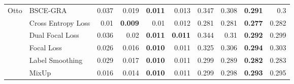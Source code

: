 \begin{table}[htbp]
\begin{tabular}{l l rrrr rrrr}
\cline{1-10}
\multirow[t]{7}{*}{Otto}
 & BSCE-GRA & 0.037 & 0.019 & \textbf{0.011} & 0.013 & 0.347 & 0.308 & \textbf{0.291} & 0.3 \\
 & Cross Entropy Loss & 0.01 & \textbf{0.009} & 0.01 & 0.012 & 0.281 & 0.281 & \textbf{0.277} & 0.282 \\
 & Dual Focal Loss & 0.036 & 0.02 & \textbf{0.011} & \textbf{0.011} & 0.344 & 0.31 & \textbf{0.292} & 0.299 \\
 & Focal Loss & 0.026 & 0.016 & \textbf{0.010} & 0.011 & 0.325 & 0.306 & \textbf{0.294} & 0.303 \\
 & Label Smoothing & 0.029 & 0.017 & \textbf{0.010} & 0.011 & 0.299 & 0.289 & \textbf{0.282} & 0.283 \\
 & MixUp & 0.016 & 0.014 & \textbf{0.010} & 0.011 & 0.299 & 0.298 & \textbf{0.293} & 0.295 \\
\cline{1-10}
\bottomrule
\end{tabular}

\end{table}